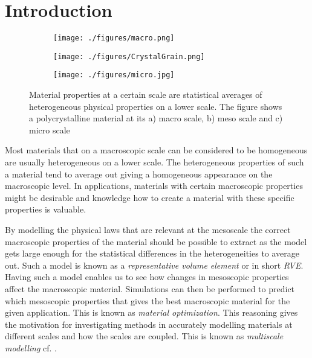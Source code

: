 \documentclass[introduction.tex]{subfiles}
\begin{document}
\chapter{Introduction}



 \begin{figure}
\centering

\begin{subfigure}{.1\textwidth}
  \centering
  \texttt{[image: ./figures/macro.png]}
  \caption{}
  \label{fig:macro}
\end{subfigure}
\scalebox{1.5}{$\boldsymbol{\longleftarrow}$}
\begin{subfigure}{.33\textwidth}
  \centering
  \texttt{[image: ./figures/CrystalGrain.png]}
  \caption{}
  \label{fig:meso}
\end{subfigure}%
\scalebox{1.5}{$\boldsymbol{\longleftarrow}$}
\begin{subfigure}{.33\textwidth}
  \centering
  \texttt{[image: ./figures/micro.jpg]}
  \caption{}
  \label{fig:micro}
\end{subfigure}
\caption{Material properties at a certain scale are statistical averages of heterogeneous physical properties on a lower scale. The figure shows a polycrystalline material at its a) macro scale, b) meso scale\cite{wiki:grain} and c) micro scale\cite{Ozawa:ko5009}}
\label{micmacmes}
\end{figure}


Most materials that on a macroscopic scale can be considered to be homogeneous are usually heterogeneous on a lower scale. The heterogeneous properties of such a material tend to average out giving a homogeneous appearance on the macroscopic level. In applications, materials with certain macroscopic properties might be desirable and knowledge how to create a material with these specific properties is valuable. 

By modelling the physical laws that are relevant at the mesoscale the correct macroscopic properties of the material should be possible to extract as the model gets large enough for the statistical differences in the heterogeneities to average out. Such a model is known as a \textit{representative volume element} or in short \textit{RVE}. Having such a model enables us to see how changes in mesoscopic properties affect the macroscopic material. Simulations can then be performed to predict which mesoscopic properties that gives the best macroscopic material for the given application. This is known as \textit{material optimization}. This reasoning gives the motivation for investigating methods in accurately modelling materials at different scales and how the scales are coupled. This is known as \textit{multiscale modelling} cf. \cite{zohdi}.
\end{document}
